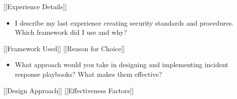 \documentclass[
]{article}
\providecommand{\tightlist}{%
  \setlength{\itemsep}{0pt}\setlength{\parskip}{0pt}}
\begin{document}
{[}{[}Experience Details{]}{]}

\begin{itemize}
\tightlist
\item
  I describe my last experience creating security standards and
  procedures. Which framework did I use and why?
\end{itemize}

{[}{[}Framework Used{]}{]} {[}{[}Reason for Choice{]}{]}

\begin{itemize}
\tightlist
\item
  What approach would you take in designing and implementing incident
  response playbooks? What makes them effective?
\end{itemize}

{[}{[}Design Approach{]}{]} {[}{[}Effectiveness Factors{]}{]}
\end{document}

